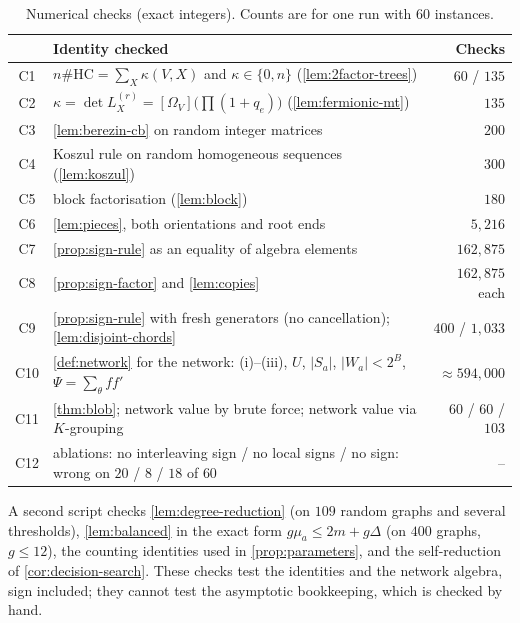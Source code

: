 \documentclass[11pt]{amsart}
\theoremstyle{plain}
\theoremstyle{definition}
\theoremstyle{remark}
\numberwithin{equation}{section}
\newcommand{\HC}{\#\mathrm{HC}}
\newcommand{\topc}[2]{[#1]\bigl(#2\bigr)}
\begin{document}
\begin{table}[ht]
\centering
\small
\caption{Numerical checks (exact integers). Counts are for one run with 60 instances.}\label{tab:checks}
\begin{tabular}{@{}clr@{}}
\toprule
& Identity checked & Checks\\
\midrule
C1 & $n\HC=\sum_X\kappa(V,X)$ and $\kappa\in\{0,n\}$ (\cref{lem:2factor-trees}) & $60$ / $135$\\
C2 & $\kappa=\det L_X^{(r)}=\topc{\Omega_V}{\prod(1+q_e)}$ (\cref{lem:fermionic-mt}) & $135$\\
C3 & \cref{lem:berezin-cb} on random integer matrices & $200$\\
C4 & Koszul rule on random homogeneous sequences (\cref{lem:koszul}) & $300$\\
C5 & block factorisation (\cref{lem:block}) & $180$\\
C6 & \cref{lem:pieces}, both orientations and root ends & $5{,}216$\\
C7 & \cref{prop:sign-rule} as an equality of algebra elements & $162{,}875$\\
C8 & \cref{prop:sign-factor} and \cref{lem:copies} & $162{,}875$ each\\
C9 & \cref{prop:sign-rule} with fresh generators (no cancellation); \cref{lem:disjoint-chords} & $400$ / $1{,}033$\\
C10 & \cref{def:network} for the network: (i)--(iii), $U$, $|S_a|$, $|W_a|<2^B$, $\Psi=\sum_\theta ff'$ & $\approx594{,}000$\\
C11 & \cref{thm:blob}; network value by brute force; network value via $K$-grouping & $60$ / $60$ / $103$\\
C12 & ablations: no interleaving sign / no local signs / no sign: wrong on $20$ / $8$ / $18$ of $60$ & --\\
\bottomrule
\end{tabular}
\end{table}

A second script checks \cref{lem:degree-reduction} (on $109$ random graphs and several thresholds),
\cref{lem:balanced} in the exact form $g\mu_a\le2m+g\Delta$ (on $400$ graphs, $g\le12$), the
counting identities used in \cref{prop:parameters}, and the self-reduction of
\cref{cor:decision-search}. These checks test the identities and the network algebra, sign
included; they cannot test the asymptotic bookkeeping, which is checked by hand.
\end{document}
